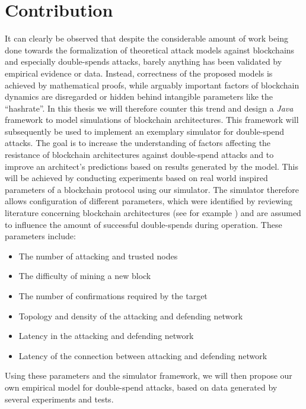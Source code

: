 \documentclass[a4paper,12pt,twoside]{report}
\begin{document}
\section{Contribution} \label{contribution}
It can clearly be observed that despite the considerable amount of work being done towards the formalization of theoretical attack models against blockchains and especially double-spends attacks, barely anything has been validated by empirical evidence or data. Instead, correctness of the proposed models is achieved by mathematical proofs, while arguably important factors of blockchain dynamics are disregarded or hidden behind intangible parameters like the ``hashrate''. In this thesis we will therefore counter this trend and design a \textit{Java} framework to model simulations of blockchain architectures. This framework will subsequently be used to implement an exemplary simulator for double-spend attacks. The goal is to increase the understanding of factors affecting the resistance of blockchain architectures against double-spend attacks and to improve an architect's predictions based on results generated by the model. This will be achieved by conducting experiments based on real world inspired parameters of a blockchain protocol using our simulator. The simulator therefore allows configuration of different parameters, which were identified by reviewing literature concerning blockchain architectures (see for example \cite{nakamoto2008bitcoin,antonopoulos2017mastering,HBDSA,infoprop}) and are assumed to influence the amount of successful double-spends during operation. These parameters include:
\begin{itemize}
\item The number of attacking and trusted nodes
\item The difficulty of mining a new block
\item The number of confirmations required by the target
\item Topology and density of the attacking and defending network
\item Latency in the attacking and defending network
\item Latency of the connection between attacking and defending network
\end{itemize}
Using these parameters and the simulator framework, we will then propose our own empirical model for double-spend attacks, based on data generated by several experiments and tests.
\end{document}

